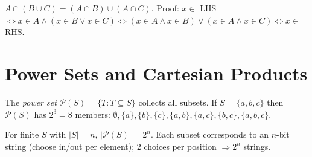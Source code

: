 \begin{example}
$A\cap(B\cup C)=(A\cap B)\cup(A\cap C)$. Proof: $x\in$ LHS $\iff x\in A\land(x\in B\lor x\in C)\iff(x\in A\land x\in B)\lor(x\in A\land x\in C)\iff x\in$ RHS.
\end{example}

\section{Power Sets and Cartesian Products}
\label{sec:powerset}
The \emph{power set} $\mathcal{P}(S)=\{T:T\subseteq S\}$ collects all subsets. If $S=\{a,b,c\}$ then $\mathcal{P}(S)$ has $2^3=8$ members: $\emptyset,\{a\},\{b\},\{c\},\{a,b\},\{a,c\},\{b,c\},\{a,b,c\}$.

\begin{theorem}[$|\mathcal{P}(S)|=2^{|S|}$]
For finite $S$ with $|S|=n$, $|\mathcal{P}(S)|=2^n$. Each subset corresponds to an $n$-bit string (choose in/out per element); $2$ choices per position $\Rightarrow 2^n$ strings.
\end{theorem}

